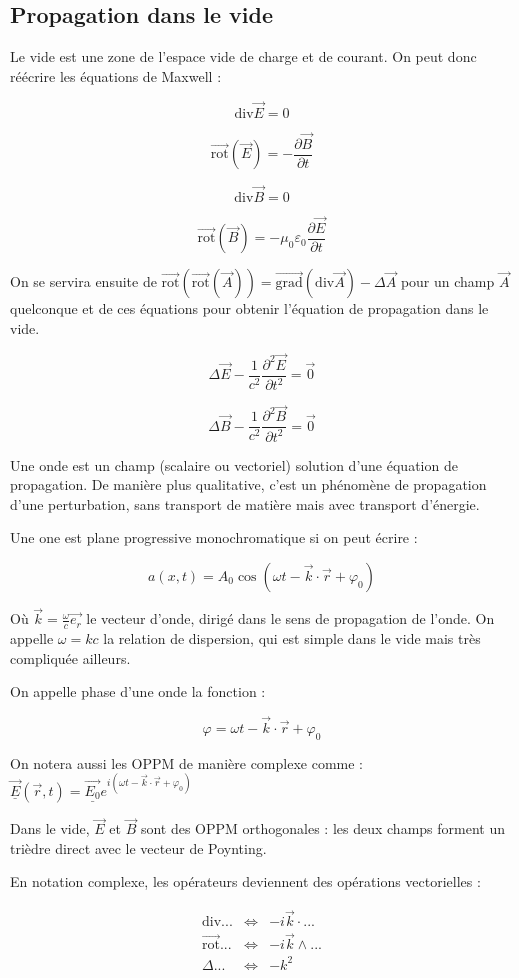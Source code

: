\documentclass[a4paper,12pt]{book}
\newcommand{\Def}[2]{\begin{tcolorbox}[colback=white,colframe=red!10!green!20!blue!75!, title=Définition : #1]#2\end{tcolorbox}}
\newcommand{\Thr}[2]{\begin{tcolorbox}[sharp corners, colback=white,colframe=red!10!blue!30!green!75!, title=Théorème : #1]#2\end{tcolorbox}}
\newcommand{\Rot}{\overrightarrow{\mathrm{rot}}}
\newcommand{\Grad}{\overrightarrow{\mathrm{grad}}}
\newcommand{\Div}{\mathrm{div}}
\renewcommand{\Vec}[1]{\overrightarrow{#1}}
\begin{document}
\subsection{Propagation dans le vide}
\Def{Vide}{Le vide est une zone de l'espace vide de charge et de courant. On peut donc réécrire les équations de Maxwell :
\par $$\Div\Vec{E} = 0$$
\par $$\Rot(\Vec{E}) = -\dfrac{\partial \Vec{B}}{\partial t}$$
\par $$\Div\Vec{B} = 0$$
\par $$\Rot(\Vec{B}) = -\mu_0\varepsilon_0\dfrac{\partial \Vec{E}}{\partial t}$$
\par On se servira ensuite de $\Rot(\Rot(\Vec{A})) = \Grad(\Div\Vec{A}) -\Delta\Vec{A}$ pour un champ $\Vec{A}$ quelconque et de ces équations pour obtenir l'équation de propagation dans le vide.}
\Thr{L'équation de propagation dans le vide}{$$\Delta\Vec{E} -\frac{1}{c^2}\dfrac{\partial^2\Vec{E}}{\partial t^2}=\Vec{0}$$
\par $$\Delta\Vec{B} -\frac{1}{c^2}\dfrac{\partial^2\Vec{B}}{\partial t^2}=\Vec{0}$$}
\Def{Onde}{Une onde est un champ (scalaire ou vectoriel) solution d'une équation de propagation. De manière plus qualitative, c'est un phénomène de propagation d'une perturbation, sans transport de matière mais avec transport d'énergie.
\par Une one est plane progressive monochromatique si on peut écrire :
\par $$a(x,t)=A_0\cos(\omega t - \Vec{k}\cdot\Vec{r}+\varphi_0)$$
\par Où $\Vec{k} = \frac{\omega}{c}\Vec{e_r}$ le vecteur d'onde, dirigé dans le sens de propagation de l'onde. On appelle $\omega = kc$ la relation de dispersion, qui est simple dans le vide mais très compliquée ailleurs.
\par On appelle phase d'une onde la fonction :
\par $$\varphi = \omega t - \Vec{k}\cdot\Vec{r}+\varphi_0$$
\par On notera aussi les OPPM de manière complexe comme : $\underline{\Vec{E}}(\Vec{r},t) = \underline{\Vec{E_0}}e^{i(\omega t -\Vec{k}\cdot\Vec{r}+\varphi_0)}$}
\Thr{}{Dans le vide, $\Vec{E}$ et $\Vec{B}$ sont des OPPM orthogonales : les deux champs forment un trièdre direct avec le vecteur de Poynting.
\par En notation complexe, les opérateurs deviennent des opérations vectorielles :
\par \begin{align*} \Div... &\Leftrightarrow & -i\Vec{k}\cdot...\\
\Rot...&\Leftrightarrow&-i\Vec{k}\wedge...\\
\Delta...&\Leftrightarrow&-k^2
\end{align*}}
\end{document}
